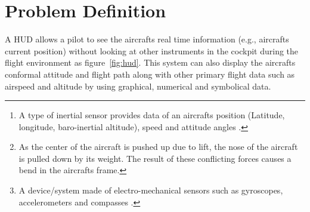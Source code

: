 \documentclass[letterpaper,10pt,onecolumn]{IEEEtran}
\begin{document}
\begin{titlepage}
	\begin{abstract}
	A Head-up Display (HUD), is a transparent display that presents all necessary data that pilots need in their flight environment. Currently, the HUD obtains data from an aircraft\textquotesingle s mounted device called inertial reference unit (IRU)\footnote{A type of inertial sensor provides data of an aircraft\textquotesingle s position (Latitude, longitude, baro-inertial altitude), speed and attitude angles \cite{iru}.}, this IRU outputs precise and aligned data to the HUD. However, the current alignment process requires specialized equipment and epoxy which is time consuming, costly, and interrupts production line progress for the original equipment manufacturer. In addition, the resulting HUD alignment, while precise, does not compensate for airframe droop\footnote{As the center of the aircraft is pushed up due to lift, the nose of the aircraft is pulled down by its weight. The result of these conflicting forces causes a bend in the aircraft\textquotesingle s frame. } during flight. Rockwell Collins looks forward to a new alignment methodology utilizing an inexpensive microelectromechanical systems (MEMS)\footnote{A device/system made of electro-mechanical sensors such as gyroscopes, accelerometers and compasses \cite{mems}.} IRU mounted onto the HUD to infer alignment data from the aircraft\textquotesingle s precisely mounted and aligned IRU. This project works on a solution that utilizes the data from both the inexpensive MEMS IRU and the aircraft mounted IRU to develop an algorithm, which aims to output precise and aligned data with reduced installation cost.
\end{abstract}
\end{titlepage}

\section{Problem Definition}
A HUD allows a pilot to see the aircraft\textquotesingle s real time information (e.g., aircraft\textquotesingle s current position) without looking at other instruments in the cockpit during the flight environment as figure~\ref{fig:hud}\cite{hud_figure}. This system can also display the aircraft\textquotesingle s conformal attitude and flight path along with other primary flight data such as airspeed and altitude by using graphical, numerical and symbolical data.
\end{document}
